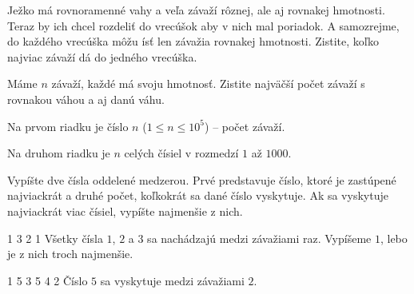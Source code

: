 




Ježko má rovnoramenné vahy a veľa závaží rôznej, ale aj rovnakej hmotnosti. Teraz by ich chcel
rozdeliť do vrecúšok aby v nich mal poriadok. A samozrejme, do každého vrecúška môžu ísť len závažia
rovnakej hmotnosti. Zistite, koľko najviac závaží dá do jedného vrecúška.


Máme $n$ závaží, každé má svoju hmotnosť. Zistite najväčší počet závaží s rovnakou váhou a aj danú
váhu.


Na prvom riadku je číslo $n$ ($1 \leq n \leq 10^5$) -- počet závaží.

Na druhom riadku je $n$ celých čísiel v rozmedzí $1$ až $1000$.


Vypíšte dve čísla oddelené medzerou. Prvé predstavuje číslo, ktoré je zastúpené najviackrát a druhé
počet, koľkokrát sa dané číslo vyskytuje. Ak sa vyskytuje najviackrát viac čísiel, vypíšte najmenšie
z nich.


1 3 2
 1
\komentar
Všetky čísla $1$, $2$ a $3$ sa nachádzajú medzi závažiami raz. Vypíšeme $1$, lebo je z nich troch
najmenšie.
\koniec

1 5 3 5 4
 2
\komentar
Číslo $5$ sa vyskytuje medzi závažiami $2$.
\koniec


